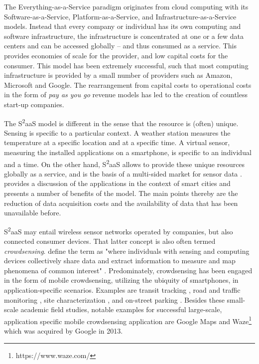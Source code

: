The Everything-as-a-Service \parencite{10.1109/MC.2011.67} paradigm originates from cloud computing \parencite{Armbrust:2010:VCC:1721654.1721672} with its Software-as-a-Service, Platform-as-a-Service, and Infrastructure-as-a-Service models. Instead that every company or individual has its own computing and software infrastructure, the infrastructure is concentrated at one or a few data centers and can be accessed globally -- and thus consumed as a service. This provides economies of scale for the provider, and low capital costs for the consumer. This model has been extremely successful, such that most computing infrastructure is provided by a small number of providers such as Amazon, Microsoft and Google. The rearrangement from capital costs to operational costs in the form of \emph{pay as you go} revenue models has led to the creation of countless start-up companies.

The S\textsuperscript{2}aaS model is different in the sense that the resource is (often) unique. Sensing is specific to a particular context. A weather station measures the temperature at a specific location and at a specific time. A virtual sensor, measuring the installed applications on a smartphone, is specific to an individual and a time. On the other hand, S\textsuperscript{2}aaS allows to provide these unique resources globally as a service, and is the basis of a multi-sided market for sensor data \parencite{fleisch2014business}.
\cite{Perera:2014iz} provides a discussion of the applications in the context of smart cities and presents a number of benefits of the model. The main points thereby are the reduction of data acquisition costs and the availability of data that has been unavailable before.

S\textsuperscript{2}aaS may entail wireless sensor networks operated by companies, but also connected consumer devices. That latter concept is also often termed \emph{crowdsensing}. \cite{ganti2011mobile} define the term as "where individuals with sensing and computing devices collectively share data and extract information to measure and map phenomena of common interest" \parencite{ganti2011mobile}. Predominately, crowdsensing has been engaged in the form of mobile crowdsensing, utilizing the ubiquity of smartphones, in application-specific scenarios. Examples are transit tracking \parencite{Thiagarajan:2010:CTT:1869983.1869993}, road and traffic monitoring \parencite{Mohan:2008:NRM:1460412.1460444}, site characterization \parencite{Chon:2012:ACP:2370216.2370288}, and on-street parking \parencite{Chen:2012:COS:2386958.2386960,6569416}. Besides these small-scale academic field studies, notable examples for successful large-scale, application specific mobile crowdsensing application are Google Maps and Waze\footnote{https://www.waze.com/} which was acquired by Google in 2013.   

